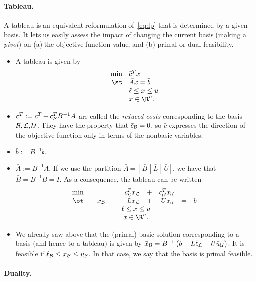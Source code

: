 \paragraph{Tableau.}
A tableau is an equivalent reformulation of~\eqref{eq:lp} that
is determined by a given basis. It lets us easily assess the impact
of changing the current basis (making a \emph{pivot}) on
(a) the objective function value, and (b) primal or dual feasibility.

\begin{itemize}
\item A tableau is given by
\[
\begin{array}{rl}
\min & \bar c^T x \\
\st  & \bar A x = \bar b \\
     & \ell \leq x \leq u \\
     & x \in \R^n.
\end{array}
\]
\item $\bar c^T := c^T - c_{\mathcal{B}}^T  B^{-1} A$ \;\;\; are called the
	\emph{reduced costs} corresponding to the basis $\mathcal{B}, \mathcal{L}, \mathcal{U}$.
	They have the property that $\bar c_{\mathcal{B}} = 0$, so $\bar c$
	expresses the direction of the objective function only
	in terms of the nonbasic variables.
\item $\bar b := B^{-1} b$.
\item $\bar A := B^{-1} A$. If we use the partition
	$\bar A = [ \bar B \; | \; \bar L \; | \; \bar U ]$,
	we have that $\bar B = B^{-1} B = I$. As a consequence,
	the tableau can be written
\[
\begin{array}{rcrcrcrcl}
\min & & & & \bar c_{\NL}^T x_{\NL} & + & c_{\NU}^T x_{\NU} \\
\st  & & x_{\B} & + & \bar L x_{\NL} & + & \bar U x_{\NU} & = & \bar b \\
     & & \multicolumn{5}{c}{\ell \leq x \leq u} \\
     & & \multicolumn{5}{c}{x \in \R^n.}
\end{array}
\]

\item We already saw above that the (primal) basic solution corresponding
	to a basis (and hence to a tableau) is given by
	$\bar x_{\mathcal{B}} =
		B^{-1} \left( b - L \bar \ell_{\mathcal{L}} - U \bar u_{\mathcal{U}} \right)$.
	It is feasible if $\ell_{\mathcal{B}} \leq \bar x_{\mathcal{B}} \leq u_{\mathcal{B}}$.
	In that case, we say that the basis is primal feasible.

\end{itemize}

\paragraph{Duality.}

